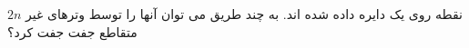\exercise
$2n$
نقطه روی یک دایره داده شده اند. به چند طریق می توان آنها را توسط وترهای غیر متقاطع جفت جفت کرد؟